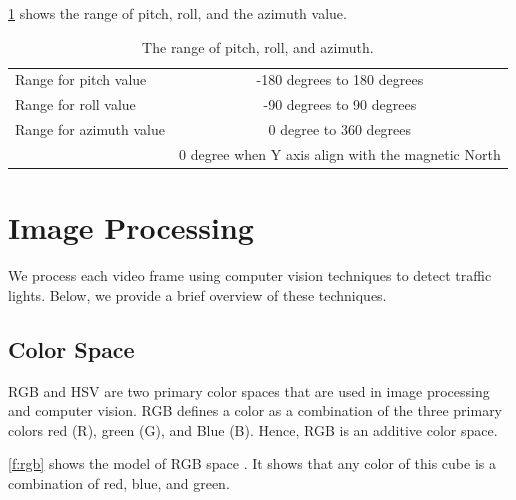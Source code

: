 \ref{t:rpy} shows the range of pitch, roll, and the azimuth value.
\begin{table}[h!]
  \centering
  \caption{The range of pitch, roll, and azimuth.}
  \label{t:rpy}
  \begin{tabular}{  l   c  }
    \rowcolor{gray!50}
    \hline
    Range for pitch value & -180 degrees to 180 degrees \\
    Range for roll value & -90 degrees to 90 degrees  \\
    Range for azimuth value & 0 degree to 360 degrees \\
    \rowcolor{gray!50}
    & 0 degree when Y axis align with the magnetic North \\
    
  \end{tabular}
\end{table}


\section {Image Processing}
We process each video frame using computer vision techniques to detect traffic lights. 
Below, we provide a brief overview of these techniques. 

\subsection{Color Space}
\label{s:color_space}
RGB \cite{rgb} and HSV \cite{hsv} are two primary color spaces that are used in image processing and computer vision.
RGB defines a color as a combination of the three primary colors red (R), green (G), and Blue (B).
Hence, RGB is an additive color space.

\ref{f:rgb} shows the model of RGB space \cite{rgb}.
It shows that any color of this cube is a combination of red, blue, and green.

